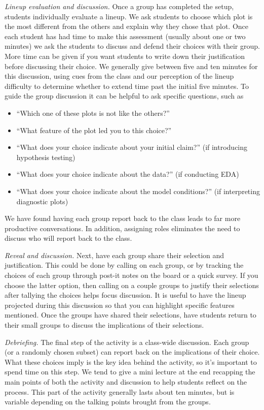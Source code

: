 \documentclass[12pt]{article}
\providecommand{\tightlist}{%
  \setlength{\itemsep}{0pt}\setlength{\parskip}{0pt}}
\begin{document}
\emph{Lineup evaluation and discussion.} Once a group has completed the
setup, students individually evaluate a lineup. We ask students to
choose which plot is the most different from the others and explain why
they chose that plot. Once each student has had time to make this
assessment (usually about one or two minutes) we ask the students to
discuss and defend their choices with their group. More time can be
given if you want students to write down their justification before
discussing their choice. We generally give between five and ten minutes
for this discussion, using cues from the class and our perception of the
lineup difficulty to determine whether to extend time past the initial
five minutes. To guide the group discussion it can be helpful to ask
specific questions, such as

\begin{itemize}
\tightlist
\item
  ``Which one of these plots is not like the others?''
\item
  ``What feature of the plot led you to this choice?''
\item
  ``What does your choice indicate about your initial claim?'' (if
  introducing hypothesis testing)
\item
  ``What does your choice indicate about the data?'' (if conducting EDA)
\item
  ``What does your choice indicate about the model conditions?'' (if
  interpreting diagnostic plots)
\end{itemize}

\noindent We have found having each group report back to the class leads
to far more productive conversations. In addition, assigning roles
eliminates the need to discuss who will report back to the class.

\emph{Reveal and discussion.} Next, have each group share their
selection and justification. This could be done by calling on each
group, or by tracking the choices of each group through post-it notes on
the board or a quick survey. If you choose the latter option, then
calling on a couple groups to justify their selections after tallying
the choices helps focus discussion. It is useful to have the lineup
projected during this discussion so that you can highlight specific
features mentioned. Once the groups have shared their selections, have
students return to their small groups to discuss the implications of
their selections.

\emph{Debriefing.} The final step of the activity is a class-wide
discussion. Each group (or a randomly chosen subset) can report back on
the implications of their choice. What these choices imply is the key
idea behind the activity, so it's important to spend time on this step.
We tend to give a mini lecture at the end recapping the main points of
both the activity and discussion to help students reflect on the
process. This part of the activity generally lasts about ten minutes,
but is variable depending on the talking points brought from the groups.
\end{document}
